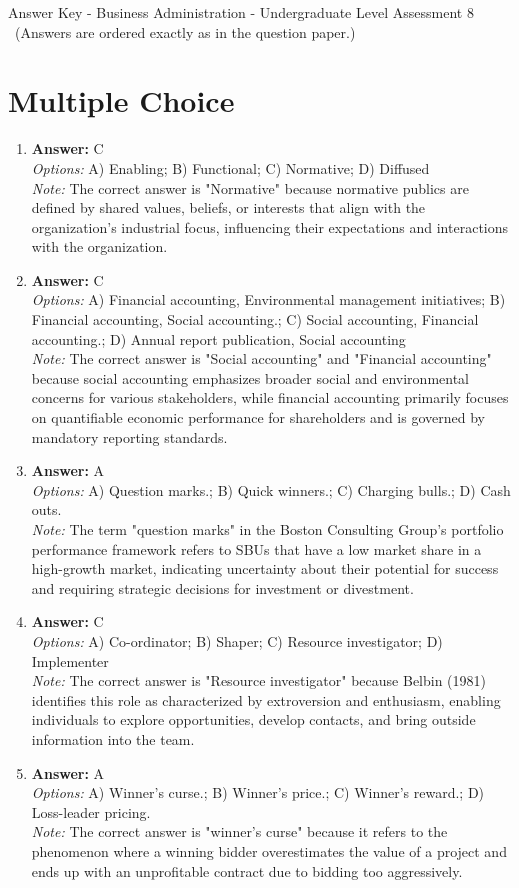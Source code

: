 \documentclass[12pt]{article}
\begin{document}
\begin{center}
Answer Key - Business Administration - Undergraduate Level Assessment 8 \
\small (Answers are ordered exactly as in the question paper.)
\end{center}

\section*{Multiple Choice}
\begin{enumerate}[label=\arabic*.]
\item \textbf{Answer:} C
\\ \textit{Options:} A) Enabling; B) Functional; C) Normative; D) Diffused
\\ \textit{Note:} The correct answer is "Normative" because normative publics are defined by shared values, beliefs, or interests that align with the organization's industrial focus, influencing their expectations and interactions with the organization.
\item \textbf{Answer:} C
\\ \textit{Options:} A) Financial accounting, Environmental management initiatives; B) Financial accounting, Social accounting.; C) Social accounting, Financial accounting.; D) Annual report publication, Social accounting
\\ \textit{Note:} The correct answer is "Social accounting" and "Financial accounting" because social accounting emphasizes broader social and environmental concerns for various stakeholders, while financial accounting primarily focuses on quantifiable economic performance for shareholders and is governed by mandatory reporting standards.
\item \textbf{Answer:} A
\\ \textit{Options:} A) Question marks.; B) Quick winners.; C) Charging bulls.; D) Cash outs.
\\ \textit{Note:} The term "question marks" in the Boston Consulting Group's portfolio performance framework refers to SBUs that have a low market share in a high-growth market, indicating uncertainty about their potential for success and requiring strategic decisions for investment or divestment.
\item \textbf{Answer:} C
\\ \textit{Options:} A) Co-ordinator; B) Shaper; C) Resource investigator; D) Implementer
\\ \textit{Note:} The correct answer is "Resource investigator" because Belbin (1981) identifies this role as characterized by extroversion and enthusiasm, enabling individuals to explore opportunities, develop contacts, and bring outside information into the team.
\item \textbf{Answer:} A
\\ \textit{Options:} A) Winner's curse.; B) Winner's price.; C) Winner's reward.; D) Loss-leader pricing.
\\ \textit{Note:} The correct answer is "winner's curse" because it refers to the phenomenon where a winning bidder overestimates the value of a project and ends up with an unprofitable contract due to bidding too aggressively.
\end{enumerate}
\end{document}
